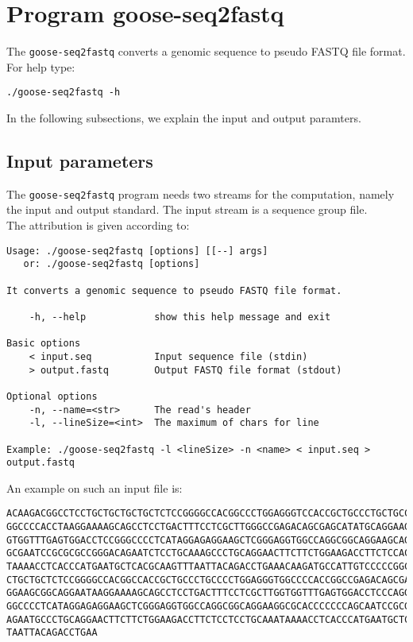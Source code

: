 \section{Program goose-seq2fastq}
The \texttt{goose-seq2fastq} converts a genomic sequence to pseudo FASTQ file format.\\
For help type:
\begin{lstlisting}
./goose-seq2fastq -h
\end{lstlisting}
In the following subsections, we explain the input and output paramters.

\subsection*{Input parameters}

The \texttt{goose-seq2fastq} program needs two streams for the computation,
namely the input and output standard. The input stream is a sequence group file.\\
The attribution is given according to:
\begin{lstlisting}
Usage: ./goose-seq2fastq [options] [[--] args]
   or: ./goose-seq2fastq [options]

It converts a genomic sequence to pseudo FASTQ file format.

    -h, --help            show this help message and exit

Basic options
    < input.seq           Input sequence file (stdin)
    > output.fastq        Output FASTQ file format (stdout)

Optional options
    -n, --name=<str>      The read's header
    -l, --lineSize=<int>  The maximum of chars for line

Example: ./goose-seq2fastq -l <lineSize> -n <name> < input.seq > output.fastq
\end{lstlisting}
An example on such an input file is:
\begin{lstlisting}
ACAAGACGGCCTCCTGCTGCTGCTGCTCTCCGGGGCCACGGCCCTGGAGGGTCCACCGCTGCCCTGCTGCCATTGTCCCC
GGCCCCACCTAAGGAAAAGCAGCCTCCTGACTTTCCTCGCTTGGGCCGAGACAGCGAGCATATGCAGGAAGCGGCAGGAA
GTGGTTTGAGTGGACCTCCGGGCCCCTCATAGGAGAGGAAGCTCGGGAGGTGGCCAGGCGGCAGGAAGCAGGCCAGTGCC
GCGAATCCGCGCGCCGGGACAGAATCTCCTGCAAAGCCCTGCAGGAACTTCTTCTGGAAGACCTTCTCCACCCCCCCAGC
TAAAACCTCACCCATGAATGCTCACGCAAGTTTAATTACAGACCTGAAACAAGATGCCATTGTCCCCCGGCCTCCTGCTG
CTGCTGCTCTCCGGGGCCACGGCCACCGCTGCCCTGCCCCTGGAGGGTGGCCCCACCGGCCGAGACAGCGAGCATATGCA
GGAAGCGGCAGGAATAAGGAAAAGCAGCCTCCTGACTTTCCTCGCTTGGTGGTTTGAGTGGACCTCCCAGGCCAGTGCCG
GGCCCCTCATAGGAGAGGAAGCTCGGGAGGTGGCCAGGCGGCAGGAAGGCGCACCCCCCCAGCAATCCGCGCGCCGGGAC
AGAATGCCCTGCAGGAACTTCTTCTGGAAGACCTTCTCCTCCTGCAAATAAAACCTCACCCATGAATGCTCACGCAAGTT
TAATTACAGACCTGAA
\end{lstlisting}

